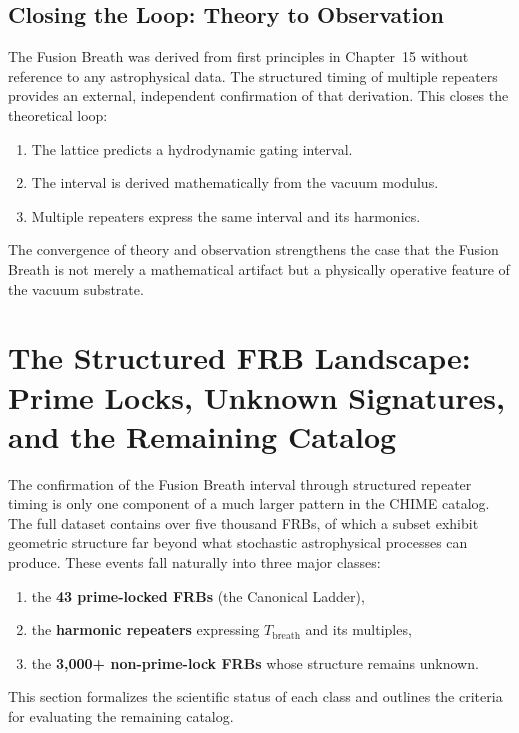 \documentclass[11pt, letterpaper, openany]{book}
\begin{document}
\subsection{Closing the Loop: Theory to Observation}

The Fusion Breath was derived from first principles in Chapter~15 without reference to
any astrophysical data. The structured timing of multiple repeaters provides an external,
independent confirmation of that derivation. This closes the theoretical loop:

\begin{enumerate}
    \item The lattice predicts a hydrodynamic gating interval.
    \item The interval is derived mathematically from the vacuum modulus.
    \item Multiple repeaters express the same interval and its harmonics.
\end{enumerate}

The convergence of theory and observation strengthens the case that the Fusion Breath
is not merely a mathematical artifact but a physically operative feature of the vacuum
substrate.

\section{The Structured FRB Landscape: Prime Locks, Unknown Signatures, and the Remaining Catalog}
\label{sec:structured_frb_landscape}

The confirmation of the Fusion Breath interval through structured repeater timing is only
one component of a much larger pattern in the CHIME catalog. The full dataset contains
over five thousand FRBs, of which a subset exhibit geometric structure far beyond what
stochastic astrophysical processes can produce. These events fall naturally into three
major classes:

\begin{enumerate}
    \item the \textbf{43 prime-locked FRBs} (the Canonical Ladder),
    \item the \textbf{harmonic repeaters} expressing $T_{\text{breath}}$ and its multiples,
    \item the \textbf{3,000+ non-prime-lock FRBs} whose structure remains unknown.
\end{enumerate}

This section formalizes the scientific status of each class and outlines the criteria for
evaluating the remaining catalog.
\end{document}
